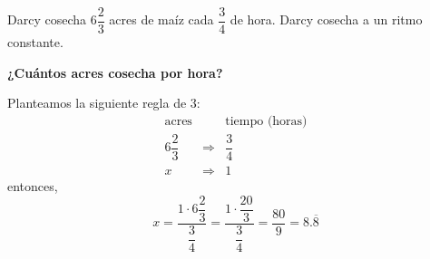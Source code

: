 Darcy cosecha $6\dfrac{2}{3}$ acres de maíz cada $\dfrac{3}{4}$ de hora. Darcy cosecha a un ritmo constante.

\textbf{¿Cuántos acres cosecha por hora?}

\begin{solutionbox}{6cm}
    Planteamos la siguiente regla de 3:
    \[
        \begin{array}{rcl}
            \text{acres}  &             & \text{tiempo (horas)} \\
            6\dfrac{2}{3} & \Rightarrow & \dfrac{3}{4}          \\
            x             & \Rightarrow & 1
        \end{array}
    \]
    entonces,
    \[x=\dfrac{1 \cdot 6\dfrac{2}{3}}{\dfrac{3}{4}}=\dfrac{1 \cdot \dfrac{20}{3}}{\dfrac{3}{4}}=\dfrac{80}{9}=8.\overline{8}\]
\end{solutionbox}